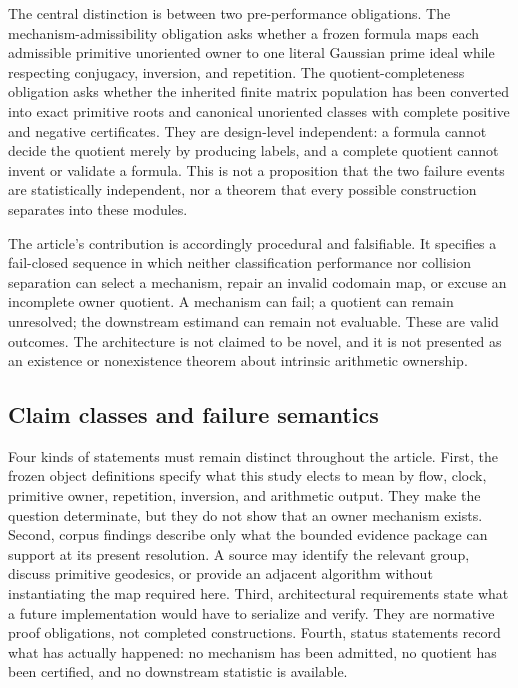 \documentclass[11pt,a4paper]{article}
\begin{document}
The central distinction is between two pre-performance obligations. The mechanism-admissibility obligation asks whether a frozen formula maps each admissible primitive unoriented owner to one literal Gaussian prime ideal while respecting conjugacy, inversion, and repetition. The quotient-completeness obligation asks whether the inherited finite matrix population has been converted into exact primitive roots and canonical unoriented classes with complete positive and negative certificates. They are design-level independent: a formula cannot decide the quotient merely by producing labels, and a complete quotient cannot invent or validate a formula. This is not a proposition that the two failure events are statistically independent, nor a theorem that every possible construction separates into these modules.

The article's contribution is accordingly procedural and falsifiable. It specifies a fail-closed sequence in which neither classification performance nor collision separation can select a mechanism, repair an invalid codomain map, or excuse an incomplete owner quotient. A mechanism can fail; a quotient can remain unresolved; the downstream estimand can remain not evaluable. These are valid outcomes. The architecture is not claimed to be novel, and it is not presented as an existence or nonexistence theorem about intrinsic arithmetic ownership.

\subsection{Claim classes and failure semantics}

Four kinds of statements must remain distinct throughout the article. First, the frozen object definitions specify what this study elects to mean by flow, clock, primitive owner, repetition, inversion, and arithmetic output. They make the question determinate, but they do not show that an owner mechanism exists. Second, corpus findings describe only what the bounded evidence package can support at its present resolution. A source may identify the relevant group, discuss primitive geodesics, or provide an adjacent algorithm without instantiating the map required here. Third, architectural requirements state what a future implementation would have to serialize and verify. They are normative proof obligations, not completed constructions. Fourth, status statements record what has actually happened: no mechanism has been admitted, no quotient has been certified, and no downstream statistic is available.
\end{document}
